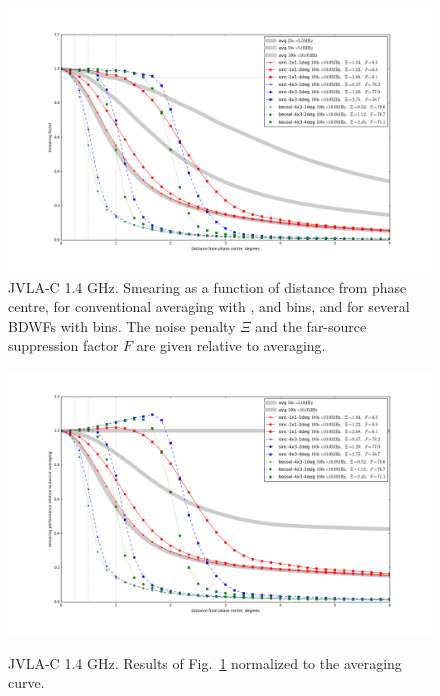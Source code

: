 \documentclass[useAMS,usenatbib]{mn2e}
\begin{document}
\begin{figure}
\includegraphics[width=.9\textwidth]{./Figures/suppression-10x100-3wfs.png}
\caption{JVLA-C 1.4 GHz. Smearing as a function of distance from phase centre, for conventional averaging with 
,  and  bins, and for several BDWFs with  bins.
The noise penalty $\Xi$ and the far-source suppression factor $F$ are given relative to 
averaging.}
\label{fig:results-example}
\end{figure}
\begin{figure}
\includegraphics[width=.9\textwidth]{./Figures/relsuppression-10x100-3wfs.png}\\
\caption{JVLA-C 1.4 GHz. Results of Fig.~\ref{fig:results-example} normalized to the  averaging curve.}
\label{fig:results-example2}
\end{figure}
\end{document}
